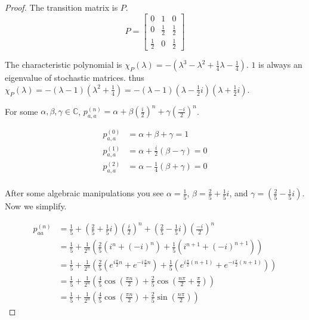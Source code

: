 \documentclass{article}
\newcommand{\C}{\mathbb{C}}
\begin{document}
\begin{proof}
    The transition matrix is $P$.  
    \[P = \begin{bmatrix}
    0 & 1 & 0 \\ 0 & \frac{1}{2} & \frac{1}{2} \\ \frac{1}{2} & 0 & \frac{1}{2}
\end{bmatrix}\] 

The characteristic polynomial is $\chi_{P}(\lambda) = -(\lambda^3 - \lambda^2 + \frac{1}{4}\lambda - \frac{1}{4})$. $1$ is always an eigenvalue of stochastic matrices. thus $\chi_P(\lambda) = -(\lambda - 1)(\lambda^2 + \frac{1}{4}) = -(\lambda - 1)(\lambda - \frac{1}{2}i)(\lambda + \frac{1}{2}i)$.

For some $\alpha, \beta, \gamma \in \C$, $p_{a, a}^{(n)} = \alpha + \beta (\frac{i}{2})^n + \gamma(\frac{-i}{2})^n$. 

\begin{align*}
    p_{a, a}^{(0)} &= \alpha + \beta + \gamma = 1 \\
    p_{a, a}^{(1)} &= \alpha + \frac{i}{2}(\beta - \gamma) = 0 \\
    p_{a, a}^{(2)} &= \alpha - \frac{1}{4}(\beta + \gamma) = 0 \\
\end{align*}

After some algebraic manipulations you see $\alpha = \frac{1}{5}$, $\beta = \frac{2}{5} + \frac{1}{5}i$, and $\gamma = (\frac{2}{5} - \frac{1}{5}i)$. Now we simplify.    

\begin{align*}
    p_{a a}^{(n)} &=\frac{1}{5}+\left(\frac{2}{5}+\frac{1}{5}i\right)\left(\frac{i}{2}\right)^{n}+\left(\frac{2}{5}-\frac{1}{5}i\right)\left(\frac{-i}{2}\right)^{n} \\
    &= \frac{1}{5} + \frac{1}{2^n}\left(\frac{2}{5}\left(i^n + (-i)^n\right) + \frac{1}{5}(i^{n + 1} + (-i)^{n + 1})\right) \\
    &= \frac{1}{5} + \frac{1}{2^n} \left(\frac{2}{5}(e^{i \frac{\pi}{2} n} + e^{-i \frac{\pi}{2} n}) + \frac{1}{5}(e^{i \frac{\pi}{2} (n + 1)} + e^{-i \frac{\pi}{2} (n  + 1)})\right) \\
    &= \frac{1}{5} + \frac{1}{2^n} \left(\frac{4}{5} \cos\left(\frac{\pi n}{2}\right) + \frac{2}{5} \cos\left(\frac{n \pi}{2} + \frac{\pi}{2}\right)\right) \\
    &= \frac{1}{5} + \frac{1}{2^n} \left(\frac{4}{5} \cos\left(\frac{\pi n}{2}\right) + \frac{2}{5} \sin\left(\frac{n \pi}{2}\right)\right)
\end{align*}

\end{proof}
\bigskip
\end{document}
